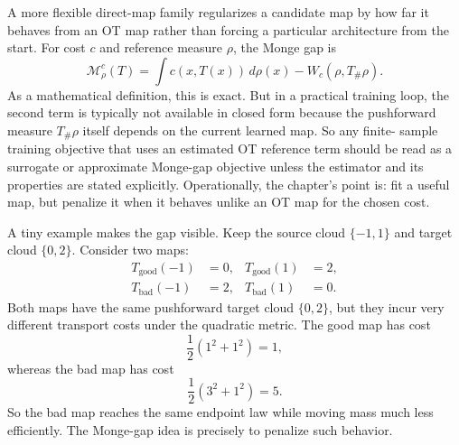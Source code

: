 A more flexible direct-map family regularizes a candidate map by how far it
behaves from an OT map rather than forcing a particular architecture from the
start.  For cost \(c\) and reference measure \(\rho\), the Monge gap is
\begin{equation}
\label{eq:bf-neural-ot-direct-monge-gap}
  \mathcal M_\rho^c(T)
  =
  \int c(x,T(x))\,d\rho(x)-W_c(\rho,T_\#\rho).
\end{equation}
As a mathematical definition, this is exact.  But in a practical training loop,
the second term is typically not available in closed form because the pushforward
measure \(T_\#\rho\) itself depends on the current learned map.  So any finite-
sample training objective that uses an estimated OT reference term should be read
as a surrogate or approximate Monge-gap objective unless the estimator and its
properties are stated explicitly.  Operationally, the chapter’s point is:
fit a useful map, but penalize it when it behaves unlike an OT map for the chosen
cost.

A tiny example makes the gap visible.  Keep the source cloud
\(\{-1,1\}\) and target cloud \(\{0,2\}\).  Consider two maps:
\begin{align}
\label{eq:bf-neural-ot-direct-good-bad-maps}
  T_{\mathrm{good}}(-1)&=0,
  &T_{\mathrm{good}}(1)&=2,\\
  T_{\mathrm{bad}}(-1)&=2,
  &T_{\mathrm{bad}}(1)&=0.
\end{align}
Both maps have the same pushforward target cloud \(\{0,2\}\), but they incur
very different transport costs under the quadratic metric.  The good map has cost
\[
  \frac{1}{2}(1^2+1^2)=1,
\]
whereas the bad map has cost
\[
  \frac{1}{2}(3^2+1^2)=5.
\]
So the bad map reaches the same endpoint law while moving mass much less
efficiently.  The Monge-gap idea is precisely to penalize such behavior.

